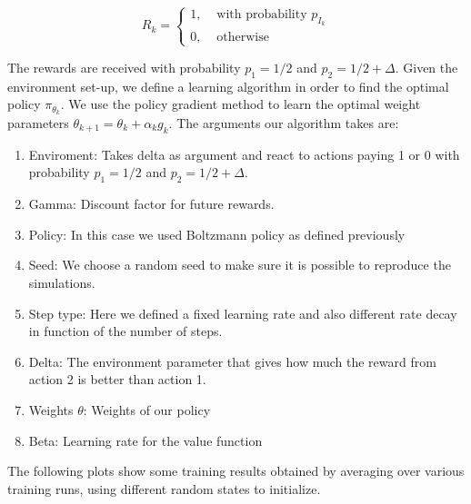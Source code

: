\documentclass[a4paper, 11pt]{article} %
\begin{document}
$$
R_{k}=\left\{\begin{array}{ll}{1,} & {\text { with probability } p_{I_{k}}} \\ {0,} & {\text { otherwise }}\end{array}\right.
$$

The rewards are received with probability $p_{1}=1 / 2$ and $p_{2}=1 / 2+\Delta$. Given the environment set-up, we define a learning algorithm in order to find the optimal policy $\pi_{\theta_{k}}$. We use the policy gradient method to learn the optimal weight parameters $\theta_{k+1}=\theta_{k}+\alpha_{k} g_{k}$. The arguments our algorithm takes are:

\begin{enumerate}
	\item Enviroment: Takes delta as argument and react to actions paying 1 or 0 with probability $p_{1}=1 / 2$ and $p_{2}=1 / 2+\Delta$.
	\item Gamma: Discount factor for future rewards.
	\item Policy: In this case we used Boltzmann policy as defined previously
	\item Seed: We choose a random seed to make sure it is possible to reproduce the simulations.
	\item Step type: Here we defined a fixed learning rate and also different rate decay in function of the number of steps.
	\item Delta: The environment parameter that gives how much the reward from action 2 is better than action 1.
	\item Weights $\theta$: Weights of our policy
	\item Beta: Learning rate for the value function
\end{enumerate}

The following plots show some training results obtained by averaging over various training runs, using different random states to initialize.
\end{document}
